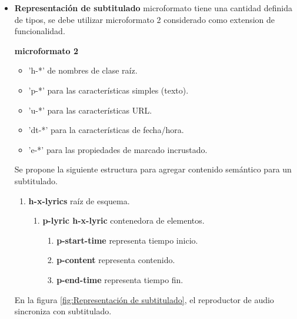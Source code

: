 \begin{itemize}
\begin{minipage}{1.0\textwidth}
	\centering
	\label{fig:Presentación glosario}
\end{minipage}

\item \textbf{Representación de subtitulado} microformato tiene una
cantidad definida de tipos, se debe utilizar microformato 2 considerado
como extension de funcionalidad. 

\textbf{microformato 2}

\begin{itemize}

\item 'h-*' de nombres de clase raíz.
\item 'p-*' para las características simples (texto).
\item 'u-*' para las características URL.
\item 'dt-*' para la características de fecha/hora.
\item 'e-*' para las propiedades de marcado incrustado. \cite{microformats2}
 
\end{itemize}

Se propone la siguiente estructura para agregar contenido semántico para un
subtitulado.

\begin{enumerate}

\item \textbf{h-x-lyrics} raíz de esquema.

	\begin{enumerate}
	
		\item \textbf{p-lyric h-x-lyric} contenedora de elementos.
		
			\begin{enumerate}

				\item \textbf{p-start-time} representa tiempo inicio.
				\item \textbf{p-content} representa contenido.
				\item \textbf{p-end-time} representa tiempo fin.			

				\end{enumerate}					

	\end{enumerate}

\end{enumerate}

En la figura \ref{fig:Representación de subtitulado}, el reproductor de audio
sincroniza con subtitulado.

\begin{minipage}{1.0\textwidth}
	\centering
	\label{fig:Representación de subtitulado}
\end{minipage}

\end{itemize}

